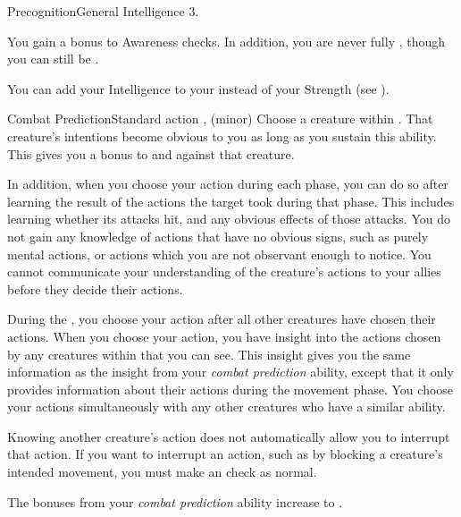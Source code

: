   \begin{feat}{Precognition}{General}
    \featpre Intelligence 3.

     You gain a  bonus to Awareness checks.
    In addition, you are never fully \unaware, though you can still be \partiallyunaware.

     You can add your Intelligence to your  instead of your Strength (see ).

    \begin{sustainability}{Combat Prediction}{Standard action}
      \abilitytags {},  (minor)
      \rankline
      Choose a creature within \longrange.
      That creature's intentions become obvious to you as long as you sustain this ability.
      This gives you a  bonus to  and  against that creature.

      In addition, when you choose your action during each phase, you can do so after learning the result of the actions the target took during that phase.
      This includes learning whether its attacks hit, and any obvious effects of those attacks.
      You do not gain any knowledge of actions that have no obvious signs, such as purely mental actions, or actions which you are not observant enough to notice.
      You cannot communicate your understanding of the creature's actions to your allies before they decide their actions.
    \end{sustainability}

     During the , you choose your action after all other creatures have chosen their actions.
    When you choose your action, you have insight into the actions chosen by any creatures within \longrange that you can see.
    This insight gives you the same information as the insight from your \textit{combat prediction} ability, except that it only provides information about their actions during the movement phase.
    You choose your actions simultaneously with any other creatures who have a similar ability.

    Knowing another creature's action does not automatically allow you to interrupt that action.
    If you want to interrupt an action, such as by blocking a creature's intended movement, you must make an  check as normal.

     The bonuses from your \textit{combat prediction} ability increase to .
  \end{feat}

